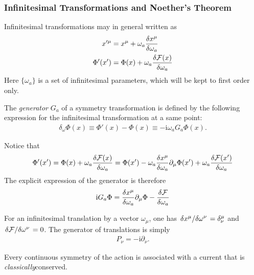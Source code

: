 \documentclass[10pt]{article}
\newcommand{\ii}{\mathrm{i}}
\begin{document}
\subsubsection{Infinitesimal Transformations and Noether's Theorem}
Infinitesimal transformations may in general written as 
\begin{align}
    x'^\mu&=x^\mu+\omega_a\fdv{x^\mu}{\omega_a}\label{eq:CST:x_prime}\\
    \Phi'(x')&=\Phi(x)+\omega_a \fdv{\mathcal{F}(x)}{\omega_a}\label{eq:CST:phi_prime} 
\end{align}
Here $\{\omega_a\}$ is a set of infinitesimal parameters, which will be kept to first order only.
\begin{definition}\label{def:generator_of_a_symmetry_transformation}
    The \textit{generator} $G_a$ of a symmetry transformation is defined by the following expression for the infinitesimal transformation at a same point:
    \begin{align}
        \delta_\omega\Phi(x)\equiv\Phi'(x)-\Phi(x)\equiv-\ii\omega_a G_a\Phi(x).
    \end{align}
\end{definition}
Notice that 
\begin{align}
    \Phi'(x')=\Phi(x)+\omega_a \fdv{\mathcal{F}(x)}{\omega_a}=\Phi(x')-\omega_a\fdv{x^\mu}{\omega_a}\partial_\mu\Phi(x')+\omega_a\fdv{\mathcal{F}(x')}{\omega_a}
\end{align}
The explicit expression of the generator is therefore 
\begin{align}
    \ii G_a\Phi=\fdv{x^\mu}{\omega_a}\partial_\mu\Phi-\fdv{\mathcal{F}}{\omega_a}
\end{align}
\begin{example}
    For an infinitesimal translation by a vector $\omega_\mu$, one has $\fdv*{x^\mu}{\omega^\nu}=\delta^\mu_\nu$ and $\fdv*{\mathcal{F}}{\omega^\nu}=0$.
    The generator of translations is simply
    \begin{align}
        P_\nu=-\ii\partial_\nu.
    \end{align}
\end{example}
\begin{theorem}
    Every continuous symmetry of the action is associated with a current that is \textit{classically}\snm conserved. 
\end{theorem}
\end{document}
